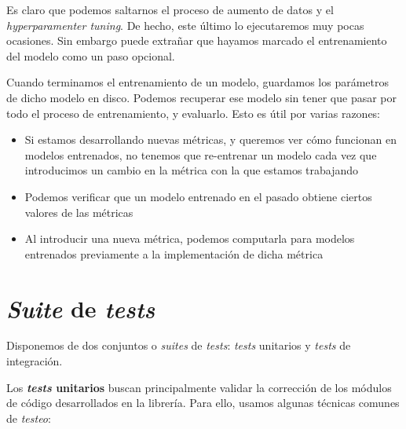 Es claro que podemos saltarnos el proceso de aumento de datos y el \textit{hyperparamenter tuning}. De hecho, este último lo ejecutaremos muy pocas ocasiones. Sin embargo puede extrañar que hayamos marcado el entrenamiento del modelo como un paso opcional.

Cuando terminamos el entrenamiento de un modelo, guardamos los parámetros de dicho modelo en disco. Podemos recuperar ese modelo sin tener que pasar por todo el proceso de entrenamiento, y evaluarlo. Esto es útil por varias razones:

\begin{itemize}
    \item Si estamos desarrollando nuevas métricas, y queremos ver cómo funcionan en modelos entrenados, no tenemos que re-entrenar un modelo cada vez que introducimos un cambio en la métrica con la que estamos trabajando
    \item Podemos verificar que un modelo entrenado en el pasado obtiene ciertos valores de las métricas
    \item Al introducir una nueva métrica, podemos computarla para modelos entrenados previamente a la implementación de dicha métrica
\end{itemize}

\section{\textit{Suite} de \textit{tests}} \label{isec:test_suite}

Disponemos de dos conjuntos o \textit{suites} de \textit{tests}: \textit{tests} unitarios y \textit{tests} de integración.

Los \textbf{\textit{tests} unitarios} buscan principalmente validar la corrección de los módulos de código desarrollados en la librería. Para ello, usamos algunas técnicas comunes de \textit{testeo}:

